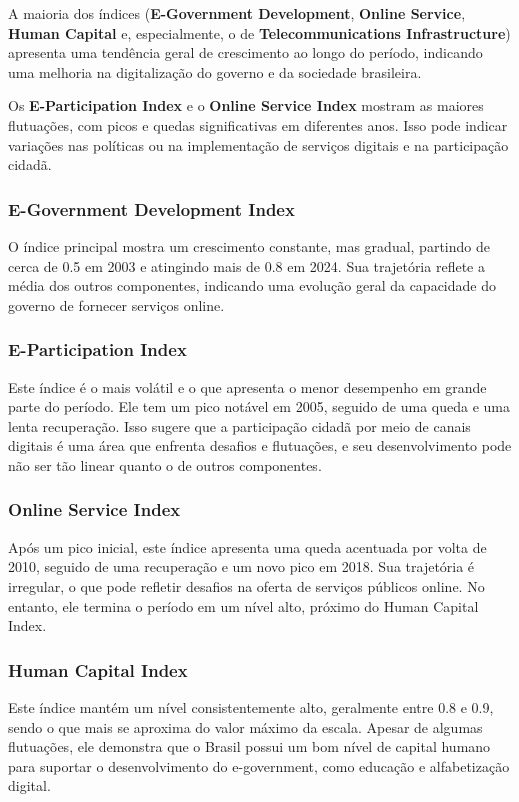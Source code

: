 A maioria dos índices (\textbf{E-Government Development}, \textbf{Online Service},  \textbf{Human Capital} e, especialmente, o de  \textbf{Telecommunications Infrastructure}) apresenta uma tendência geral de crescimento ao longo do período, indicando uma melhoria na digitalização do governo e da sociedade brasileira.

Os  \textbf{E-Participation Index} e o \textbf{Online Service Index} mostram as maiores flutuações, com picos e quedas significativas em diferentes anos. Isso pode indicar variações nas políticas ou na implementação de serviços digitais e na participação cidadã.

\subsubsection{E-Government Development Index} O índice principal mostra um crescimento constante, mas gradual, partindo de cerca de 0.5 em 2003 e atingindo mais de 0.8 em 2024. Sua trajetória reflete a média dos outros componentes, indicando uma evolução geral da capacidade do governo de fornecer serviços online.

\subsubsection{E-Participation Index} Este índice é o mais volátil e o que apresenta o menor desempenho em grande parte do período. Ele tem um pico notável em 2005, seguido de uma queda e uma lenta recuperação. Isso sugere que a participação cidadã por meio de canais digitais é uma área que enfrenta desafios e flutuações, e seu desenvolvimento pode não ser tão linear quanto o de outros componentes.

\subsubsection{Online Service Index} Após um pico inicial, este índice apresenta uma queda acentuada por volta de 2010, seguido de uma recuperação e um novo pico em 2018. Sua trajetória é irregular, o que pode refletir desafios na oferta de serviços públicos online. No entanto, ele termina o período em um nível alto, próximo do Human Capital Index.

\subsubsection{Human Capital Index} Este índice mantém um nível consistentemente alto, geralmente entre 0.8 e 0.9, sendo o que mais se aproxima do valor máximo da escala. Apesar de algumas flutuações, ele demonstra que o Brasil possui um bom nível de capital humano para suportar o desenvolvimento do e-government, como educação e alfabetização digital.

